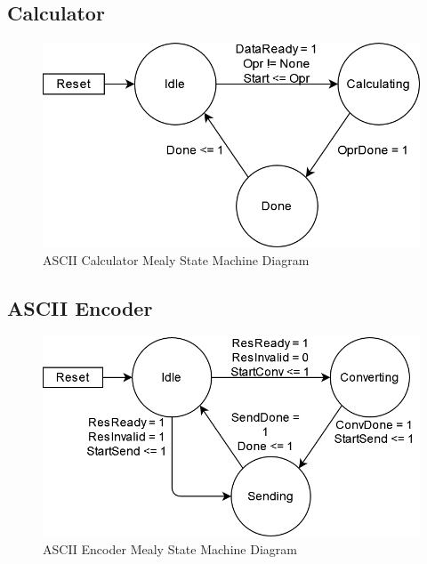\documentclass[11pt]{article}
\begin{document}
\subsection{Calculator}

\begin{figure}[H]        
    \centering
    \includegraphics[width=.66\textwidth]{CalculatorSM.drawio.png}
    \caption{ASCII Calculator Mealy State Machine Diagram}
    \label{fig:calcsm}
\end{figure} 

\subsection{ASCII Encoder}

\begin{figure}[H]        
    \centering
    \includegraphics[width=.66\textwidth]{EncoderSM.drawio.png}
    \caption{ASCII Encoder Mealy State Machine Diagram}
    \label{fig:encodersm}
\end{figure} 
\end{document}
